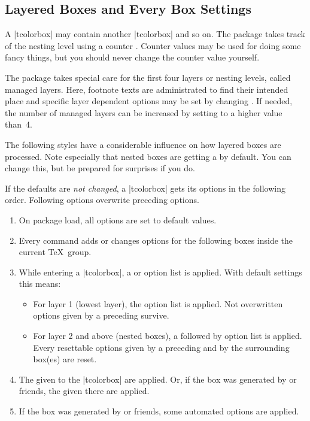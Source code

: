 \clearpage
\subsection{Layered Boxes and Every Box Settings}\label{subsec:everybox}
A |tcolorbox| may contain another |tcolorbox| and so on. The package
takes track of the nesting level using a counter . Counter values
may be used for doing some fancy things, but you should never change
the counter value yourself.

The package takes special care for the first four layers or nesting levels,
called managed layers.
Here, footnote texts are administrated to find their intended place
and specific layer dependent options may be set by changing
.
If needed, the number of managed layers can be increased by setting
 to a higher value than~4.

The following styles have a considerable influence on how layered boxes
are processed. Note especially that nested boxes are getting a
 by default. You can change this, but be prepared for
surprises if you do.

If the defaults are \emph{not changed}, a |tcolorbox| gets its options
in the following order. Following options overwrite preceding options.
\begin{enumerate}
\item On package load, all options are set to default values.
\item Every  command adds or changes options for the following boxes
  inside the current \TeX\ group.
\item While entering a |tcolorbox|, a  or
   option list is applied.
  With default settings this means:
  \begin{itemize}
  \item For layer 1 (lowest layer), the  option list is applied.
    Not overwritten options given by a preceding  survive.
  \item For layer 2 and above (nested boxes), a  followed by
     option list is applied.
    Every resettable options given by a preceding 
    and by the surrounding box(es) are reset.
  \end{itemize}
\item The  given to the |tcolorbox| are applied.
  Or, if the box was generated by  or friends,
  the  given there are applied.
\item If the box was generated by  or friends,
  some automated options are applied.
\end{enumerate}


